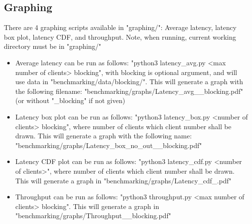 \subsection{Graphing}
There are 4 graphing scripts available in "graphing/": Average latency, latency box plot, latency CDF, and throughput.
Note, when running, current working directory must be in "graphing/"

\begin{itemize}
    \item Average latency can be run as follows: "python3 latency\_avg.py <max number of clients> blocking", with blocking is optional argument, and will use data in "benchmarking/data/blocking/". 
    This will generate a graph with the following filename: "benchmarking/graphs/Latency\_avg\_<max number of clients>\_blocking.pdf" (or without "\_blocking" if not given)
    \item Latency box plot can be run as follows: "python3 latency\_box.py <number of clients> blocking", where number of clients which client number shall be drawn.
    This will generate a graph with the following name: \\"benchmarking/graphs/Latency\_box\_no\_out\_<number of clients>\_blocking.pdf"
    \item Latency CDF plot can be run as follows: "python3 latency\_cdf.py <number of clients>", where number of clients which client number shall be drawn.
    This will generate a graph in "benchmarking/graphs/Latency\_cdf\_<number of clients>.pdf"
    \item Throughput can be run as follows: "python3 throughput.py <max number of clients> blocking".
    This will generate a graph in "benchmarking/graphs/Throughput\_<max number of clients>\_blocking.pdf"
\end{itemize}




